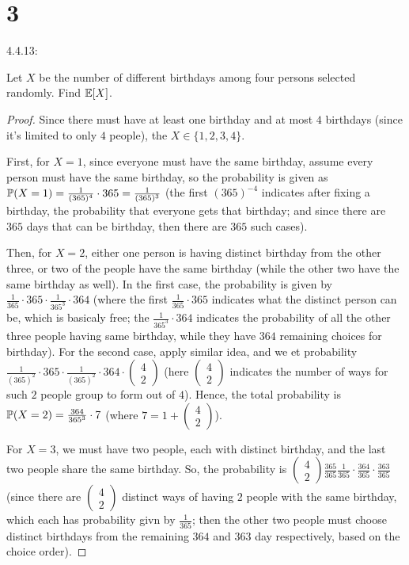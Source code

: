 \documentclass{article}
\begin{document}
\section*{3}
\begin{ques}\label{q3}
    4.4.13:

    Let $X$ be the number of different birthdays among four persons selected randomly. Find $\mathbb{E}[X]$.
\end{ques}
\begin{proof}
    Since there must  have at least one birthday and at most $4$ birthdays (since it's limited to only $4$ people), the $X \in \{1,2,3,4\}$. 

    First, for $X=1$, since everyone must have the same birthday, assume every person must have the same birthday, so the probability is given as $\mathbb{P}(X=1)=\frac{1}{(365)^4}\cdot 365 = \frac{1}{(365)^3}$ (the first $(365)^{-4}$ indicates after fixing a birthday, the probability that everyone gets that birthday; and since there are $365$ days that can be birthday, then there are $365$ such cases).

    Then, for $X=2$, either one person is having distinct birthday from the other three, or two of the people have the same birthday (while the other two have the same birthday as well). In the first case, the probability is given by $\frac{1}{365}\cdot 365 \cdot \frac{1}{365^3}\cdot 364$ (where the first $\frac{1}{365}\cdot 365$ indicates what the distinct person can be, which is basicaly free; the $\frac{1}{365^3}\cdot 364$ indicates the probability of all the other three people having same birthday, while they have $364$ remaining choices for birthday). For the second case, apply similar idea, and we et probability $\frac{1}{(365)^2}\cdot 365 \cdot \frac{1}{(365)^2}\cdot 364 \cdot \begin{pmatrix}4\\2\end{pmatrix}$ (here $\begin{pmatrix}4\\2\end{pmatrix}$ indicates the number of ways for such $2$ people group to form out of $4$). Hence, the total probability is $\mathbb{P}(X=2)=\frac{364}{365^3}\cdot 7$ (where $7 = 1+\begin{pmatrix}4\\2\end{pmatrix}$).

    For $X=3$, we must have two people, each with distinct birthday, and the last two people share the same birthday. So, the probability is $\begin{pmatrix}4\\2\end{pmatrix}\frac{365}{365}\frac{1}{365}\cdot \frac{364}{365}\cdot\frac{363}{365}$ (since there are $\begin{pmatrix}4\\2\end{pmatrix}$ distinct ways of having $2$ people with the same birthday, which each has probability givn by $\frac{1}{365}$; then the other two people must choose distinct birthdays from the remaining $364$ and $363$ day respectively, based on the choice order).


\end{proof}
\end{document}
